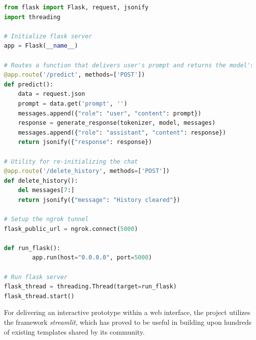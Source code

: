 \begin{center}
\begin{minipage}{1\textwidth}
\begin{lstlisting}[language=Python, frame=single, caption=Writing the Streamlit web app.]
from flask import Flask, request, jsonify
import threading
    
# Initialize flask server
app = Flask(__name__)

# Routes a function that delivers user's prompt and returns the model's response in a JSON format
@app.route('/predict', methods=['POST'])
def predict():
    data = request.json
    prompt = data.get('prompt', '')
    messages.append({"role": "user", "content": prompt})
    response = generate_response(tokenizer, model, messages)
    messages.append({"role": "assistant", "content": response})
    return jsonify({"response": response})

# Utility for re-initializing the chat
@app.route('/delete_history', methods=['POST'])
def delete_history():
    del messages[7:]
    return jsonify({"message": "History cleared"})
     
# Setup the ngrok tunnel
flask_public_url = ngrok.connect(5000)
    
def run_flask():
        app.run(host="0.0.0.0", port=5000)
    
# Run flask server
flask_thread = threading.Thread(target=run_flask)
flask_thread.start()
\end{lstlisting}
\end{minipage}
\end{center}

For delivering an interactive prototype within a web interface, the project utilizes the framework \textit{streamlit}, which has proved to be useful in building upon hundreds of existing templates shared by its community.

